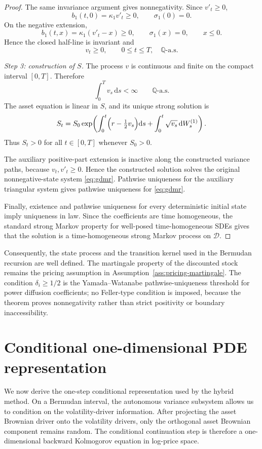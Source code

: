 \documentclass[pdflatex,sn-mathphys-num]{sn-jnl}
\theoremstyle{thmstyleone}%
\theoremstyle{thmstylethree}%
\theoremstyle{thmstyletwo}%
\newcommand{\dd}{\mathrm d}
\newcommand{\Q}{\mathbb Q}
\begin{document}
\begin{proof}
The same invariance argument gives nonnegativity. Since $v'_t\ge0$,
\[
b_1(t,0)=\kappa_1v'_t\ge0,\qquad \sigma_1(0)=0.
\]
On the negative extension,
\[
b_1(t,x)=\kappa_1(v'_t-x)\ge0,\qquad
\sigma_1(x)=0,\qquad x\le0.
\]
Hence the closed half-line is invariant and
\[
v_t\ge0,\qquad 0\le t\le T,\quad \Q\text{-a.s.}
\]

\emph{Step 3: construction of $S$.}
The process $v$ is continuous and finite on the compact interval $[0,T]$.
Therefore
\[
\int_0^T v_s\,\dd s<\infty\qquad \Q\text{-a.s.}
\]
The asset equation is linear in $S$, and its unique strong solution is
\[
S_t
=S_0
\exp\!\left(
\int_0^t \Bigl(r-\tfrac12 v_s\Bigr)\dd s
+\int_0^t \sqrt{v_s}\,\dd W_s^{(1)}
\right).
\]
Thus $S_t>0$ for all $t\in[0,T]$ whenever $S_0>0$.

The auxiliary positive-part extension is inactive along the constructed variance
paths, because $v_t,v'_t\ge0$. Hence the constructed solution solves the
original nonnegative-state system \eqref{eq:gdmr}. Pathwise uniqueness for the
auxiliary triangular system gives pathwise uniqueness for \eqref{eq:gdmr}.

Finally, existence and pathwise uniqueness for every deterministic initial state
imply uniqueness in law. Since the coefficients are time homogeneous, the
standard strong Markov property for well-posed time-homogeneous SDEs gives that
the solution is a time-homogeneous strong Markov process on $\mathcal D$.
\end{proof}

Consequently, the state process and the transition kernel used in the Bermudan
recursion are well defined. The martingale property of the discounted stock
remains the pricing assumption in Assumption~\ref{ass:pricing-martingale}. The
condition $\delta_i\ge1/2$ is the Yamada--Watanabe pathwise-uniqueness threshold
for power diffusion coefficients; no Feller-type condition is imposed, because
the theorem proves nonnegativity rather than strict positivity or boundary
inaccessibility.

\section{Conditional one-dimensional PDE representation}\label{sec:conditional_pde}

We now derive the one-step conditional representation used by the hybrid method.
On a Bermudan interval, the autonomous variance subsystem allows us to condition
on the volatility-driver information. After projecting the asset Brownian driver
onto the volatility drivers, only the orthogonal asset Brownian component remains
random. The conditional continuation step is therefore a one-dimensional
backward Kolmogorov equation in log-price space.
\end{document}

